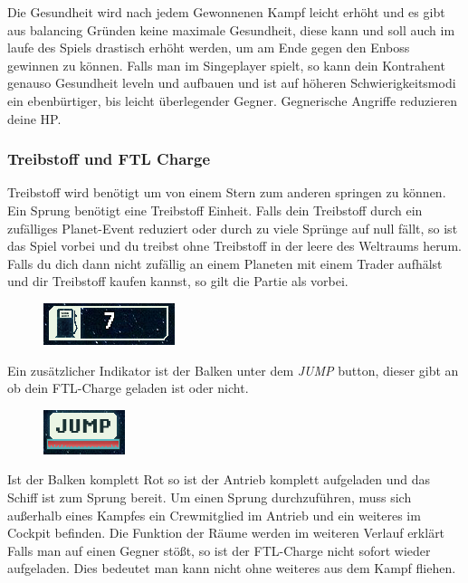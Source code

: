 \documentclass[fontsize=12pt,paper=a4,twoside]{scrartcl}
\begin{document}
Die Gesundheit wird nach jedem Gewonnenen Kampf leicht erhöht und es gibt aus balancing Gründen keine maximale Gesundheit, diese kann und soll auch im laufe des Spiels drastisch erhöht werden, um am Ende gegen den Enboss gewinnen zu können.
Falls man im Singeplayer spielt, so kann dein Kontrahent genauso Gesundheit leveln und aufbauen und ist auf höheren Schwierigkeitsmodi ein ebenbürtiger, bis leicht überlegender Gegner. Gegnerische Angriffe reduzieren deine HP.

\subsubsection{Treibstoff und FTL Charge}
Treibstoff wird benötigt um von einem Stern zum anderen springen zu können. Ein Sprung benötigt eine Treibstoff Einheit. Falls dein Treibstoff durch ein zufälliges Planet-Event reduziert oder durch zu viele Sprünge auf null fällt, so ist das Spiel vorbei und du treibst ohne Treibstoff in der leere des Weltraums herum. Falls du dich dann nicht zufällig an einem Planeten mit einem Trader aufhälst und dir Treibstoff kaufen kannst, so gilt die Partie als vorbei.
\begin{figure}[H]
\centering
\includegraphics[width=0.4\linewidth]{DasSpiel/Ui/fuel.png}
\end{figure}
Ein zusätzlicher Indikator ist der Balken unter dem \textit{JUMP} button, dieser gibt an ob dein FTL-Charge geladen ist oder nicht. 
\begin{figure}[H]
\centering
\includegraphics[width=0.4\linewidth]{DasSpiel/Ui/ftl_charge.png}
\end{figure}
Ist der Balken komplett Rot so ist der Antrieb komplett aufgeladen und das Schiff ist zum Sprung bereit. Um einen Sprung durchzuführen, muss sich außerhalb eines Kampfes ein Crewmitglied im Antrieb und ein weiteres im Cockpit befinden. Die Funktion der Räume werden im weiteren Verlauf erklärt
\\
Falls man auf einen Gegner stößt, so ist der FTL-Charge nicht sofort wieder aufgeladen. Dies bedeutet man kann nicht ohne weiteres aus dem Kampf fliehen.
\end{document}
